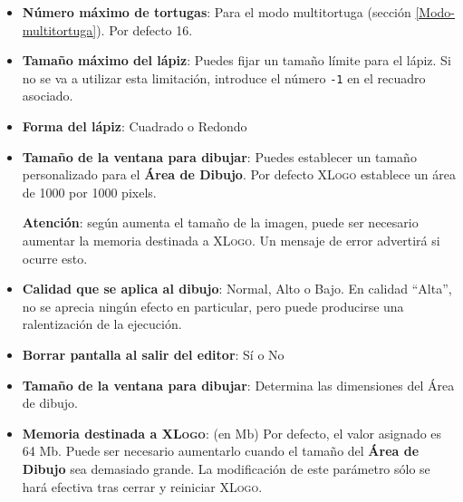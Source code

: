 \begin{itemize}
\begin{itemize}
\begin{itemize}
\begin{center}
                  \end{center}
               \item \textbf{N\'umero m\'aximo de tortugas}:
                   Para el modo
                  multitortuga (secci\'on \ref{Modo-multitortuga}).
                  Por defecto 16.
               \item \textbf{Tama\~no m\'aximo del l\'apiz}:
                   Puedes fijar un
                  tama\~no l\'imite para el l\'apiz. Si no se va a utilizar
                  esta limitaci\'on, introduce el n\'umero \texttt{-1} en el
                  recuadro asociado. 
               \item \textbf{Forma del l\'apiz}: 
                  Cuadrado o Redondo 
               \item \textbf{Tama\~no de la ventana para dibujar}:
                   Puedes establecer un tama\~no
                  personalizado para el \textbf{\'Area de Dibujo}. Por defecto
                  \textsc{XLogo} establece un \'area de 1000 por 1000 pixels.

                  \textbf{Atenci\'on}: seg\'un aumenta el tama\~no de la
                  imagen, puede ser necesario aumentar la memoria destinada
                  a \textsc{XLogo}. Un mensaje de error advertir\'a si ocurre
                  esto.
               \item \textbf{Calidad que se aplica al dibujo}:
                  Normal, Alto o Bajo. En calidad
                  ``Alta'', no se aprecia ning\'un efecto en
                  particular, pero puede producirse una ralentizaci\'on de la
                  ejecuci\'on.
               \item \textbf{Borrar pantalla al salir del editor}: S\'i o No
               \item \textbf{Tama\~no de la ventana para dibujar}:
                  Determina las dimensiones del
                  \'Area de dibujo.
               \item \textbf{Memoria destinada a \textsc{XLogo}}:
                   (en Mb) Por
                  defecto, el valor asignado es 64 Mb. Puede ser necesario
                  aumentarlo cuando el tama\~no del \textbf{\'Area de Dibujo}
                  sea demasiado grande. La modificaci\'on de este par\'ametro
                  s\'olo se har\'a efectiva tras cerrar y reiniciar
                  \textsc{XLogo}.


\end{itemize}
\end{itemize}
\end{itemize}
